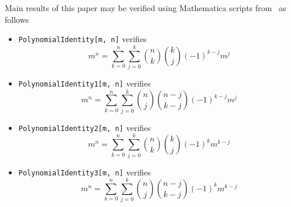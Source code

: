Main results of this paper may be verified using Mathematica scripts from~\cite{PK22Source} as follows
\begin{itemize}
    \item \texttt{PolynomialIdentity[m, n]} verifies
    \[
        m^n = \sum_{k=0}^{n} \sum_{j=0}^{k} \binom{n}{k} \binom{k}{j} (-1)^{k-j} m^j
    \]
    \item \texttt{PolynomialIdentity1[m, n]} verifies
    \[
        m^n = \sum_{k=0}^{n} \sum_{j=0}^{k} \binom{n}{j} \binom{n-j}{k-j} (-1)^{k-j} m^j
    \]
    \item \texttt{PolynomialIdentity2[m, n]} verifies
    \[
        m^n = \sum_{k=0}^{n} \sum_{j=0}^{k} \binom{n}{k} \binom{k}{j} (-1)^{k} m^{k-j}
    \]
    \item \texttt{PolynomialIdentity3[m, n]} verifies
    \[
        m^n = \sum_{k=0}^{n} \sum_{j=0}^{k} \binom{n}{j} \binom{n-j}{k-j} (-1)^{k} m^{k-j}
    \]
\end{itemize}